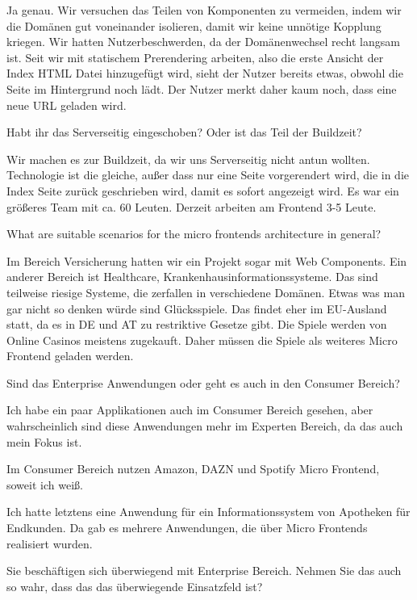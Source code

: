 \begin{description}
    \ManfredSteyer Ja genau. Wir versuchen das Teilen von Komponenten zu vermeiden, indem wir die Domänen gut voneinander isolieren, damit wir keine unnötige Kopplung kriegen. Wir hatten Nutzerbeschwerden, da der Domänenwechsel recht langsam ist. Seit wir mit statischem Prerendering arbeiten, also die erste Ansicht der Index HTML Datei hinzugefügt wird, sieht der Nutzer bereits etwas, obwohl die Seite im Hintergrund noch lädt. Der Nutzer merkt daher kaum noch, dass eine neue URL geladen wird.

    \NicoVogel Habt ihr das Serverseitig eingeschoben? Oder ist das Teil der Buildzeit?

    \ManfredSteyer Wir machen es zur Buildzeit, da wir uns Serverseitig nicht antun wollten. Technologie ist die gleiche, außer dass nur eine Seite vorgerendert wird, die in die Index Seite zurück geschrieben wird, damit es sofort angezeigt wird. Es war ein größeres Team mit ca. 60 Leuten. Derzeit arbeiten am Frontend 3-5 Leute.

    \NicoVogel What are suitable scenarios for the micro frontends architecture in general?

    \ManfredSteyer Im Bereich Versicherung hatten wir ein Projekt sogar mit Web Components. Ein anderer Bereich ist Healthcare, Krankenhausinformationssysteme. Das sind teilweise riesige Systeme, die zerfallen in verschiedene Domänen. Etwas was man gar nicht so denken würde sind Glücksspiele. Das findet eher im EU-Ausland statt, da es in DE und AT zu restriktive Gesetze gibt. Die Spiele werden von Online Casinos meistens zugekauft. Daher müssen die Spiele als weiteres Micro Frontend geladen werden.

    \NicoVogel Sind das Enterprise Anwendungen oder geht es auch in den Consumer Bereich?

    \ManfredSteyer Ich habe ein paar Applikationen auch im Consumer Bereich gesehen, aber wahrscheinlich sind diese Anwendungen mehr im Experten Bereich, da das auch mein Fokus ist.

    \NicoVogel Im Consumer Bereich nutzen Amazon, DAZN und Spotify Micro Frontend, soweit ich weiß.

    \ManfredSteyer Ich hatte letztens eine Anwendung für ein Informationssystem von Apotheken für Endkunden. Da gab es mehrere Anwendungen, die über Micro Frontends realisiert wurden.

    \NicoVogel Sie beschäftigen sich überwiegend mit Enterprise Bereich. Nehmen Sie das auch so wahr, dass das das überwiegende Einsatzfeld ist?


\end{description}
